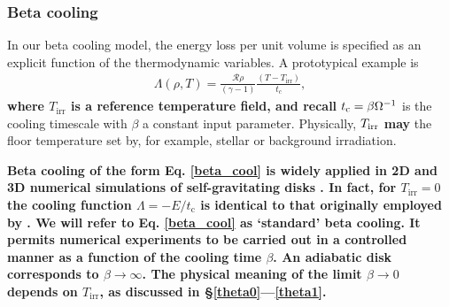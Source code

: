 \subsubsection{Beta cooling}\label{beta_cool_model}
In our beta cooling model, the energy loss per unit volume is specified  
as an explicit function of the thermodynamic variables. 
A prototypical example is 
\begin{align}\label{beta_cool}
  \Lambda(\rho, T) =
  \frac{\mathcal{R}\rho}{(\gamma-1)}\frac{\left(T-T_\mathrm{irr}\right)}{t_c},
\end{align}
{\bf where $T_\mathrm{irr}$ is a reference temperature field, and
recall}  $t_\mathrm{c} = \beta\Omega^{-1}$ is 
the cooling timescale with $\beta$ a constant input parameter. 
Physically, $T_\mathrm{irr}$ {\bf may} the floor temperature set by, 
for example, stellar or background irradiation. 

{\bf
Beta cooling of the form Eq. \ref{beta_cool} is widely applied in 2D
and 3D numerical simulations of self-gravitating disks \citep{gammie01,
  rice05,rice11,paardekooper12}. In fact, for $T_\mathrm{irr}=0$ the 
cooling function $\Lambda = -E/t_\mathrm{c}$ is identical 
to that originally employed by \cite{gammie01}. 
We will refer to Eq. \ref{beta_cool} as  
`standard' beta cooling. It permits numerical experiments to be
carried out in a controlled manner as a function of the cooling time
$\beta$. An adiabatic disk corresponds to $\beta\to \infty$. The
physical meaning of the limit $\beta\to0$ depends on $T_\mathrm{irr}$, as
discussed in \S\ref{theta0}---\ref{theta1}.  
}

